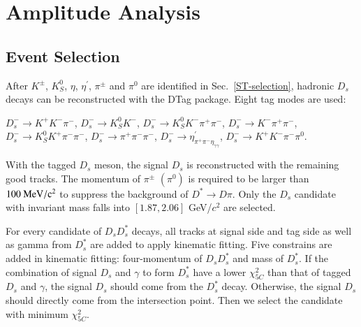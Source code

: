 \section{Amplitude Analysis}
\label{Amplitude-Analysis}
\subsection{Event Selection}
\label{AASelection}
\par{
    After $K^{\pm}$, $K_S^{0}$, $\eta$, $\eta^{'}$, $\pi^{\pm}$ and $\pi^{0}$ are identified in Sec.~\ref{ST-selection}, hadronic $D_{s}$ decays can be reconstructed with the DTag package. 
    Eight tag modes are used:

$D_{s}^{-} \rightarrow K^{+}K^{-}\pi^{-}$, $D_{s}^{-} \rightarrow K_{S}^{0}K^{-}$, $D_{s}^{-} \rightarrow K_{S}^{0}K^{-}\pi^{+}\pi^{-}$, $D_{s}^{-} \rightarrow K^{-}\pi^{+}\pi^{-}$, $D_{s}^{-} \rightarrow K_{S}^{0}K^{+}\pi^{-}\pi^{-}$, $D_{s}^{-} \rightarrow \pi^{+}\pi^{-}\pi^{-}$, $D_{s}^{-} \rightarrow \eta^{'}_{\pi^{+}\pi^{-}\eta_{\gamma\gamma}}$, $D_{s}^{-} \rightarrow K^{+}K^{-}\pi^{-}\pi^{0}$.


With the tagged $D_{s}$ meson, the signal $D_{s}$ is reconstructed with the remaining good tracks. 
The momentum of $\pi^{\pm}$ $(\pi^{0})$ is required to be larger than $100\ {\rm MeV/c^{2}}$ to suppress the background of $D^{*} \rightarrow D\pi$.
Only the $D_{s}$ candidate with invariant mass falls into $[1.87, 2.06]$ GeV/$c^{2}$ are selected.

For every candidate of $D_{s}D_{s}^{*}$ decays, all tracks at signal side and tag side as well as gamma from $D_{s}^{*}$ are added to apply kinematic fitting. 
Five constrains are added in kinematic fitting: four-momentum of $D_{s}D_{s}^{*}$ and mass of $D_{s}^{*}$. 
If the combination of signal $D_{s}$ and $\gamma$ to form $D_{s}^{*}$ have a lower $\chi_{5C}^{2}$ than that of tagged $D_{s}$ and $\gamma$, the signal $D_{s}$ should come from the $D_{s}^{*}$ decay.
Otherwise, the signal $D_{s}$ should directly come from the intersection point.
Then we select the candidate with minimum $\chi_{5C}^{2}$.  

}
